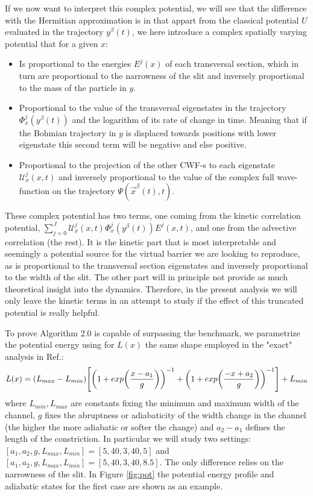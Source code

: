 \documentclass[11pt, a4paper]{article} %
\newcommand{\U}{\mathscr{U}}
\begin{document}
If we now want to interpret this complex potential, we will see that the difference with the Hermitian approximation is in that appart from the classical potential $U$ evaluated in the trajectory $y^\beta(t)$, we here introduce a complex spatially varying potential that for a given $x$:
\begin{itemize}
\item Is proportional to the energies $E^j(x)$ of each transversal section, which in turn are proportional to the narrowness of the slit and inversely proportional to the mass of the particle in $y$.
\item Proportional to the value of the transversal eigenstates in the trajectory $\Phi^j_x(y^\beta(t))$ and the logarithm of its rate of change in time. Meaning that if the Bohmian trajectory in $y$ is displaced towards positions with lower eigenstate this second term will be negative and else positive.
\item Proportional to the projection of the other CWF-s to each eigenstate $\U^j_x(x,t)$ and inversely proportional to the value of the complex full wave-function on the trajectory $\Psi(\vec{x}^\beta(t),t)$.
\end{itemize}

These complex potential has two terms, one coming from the kinetic correlation potential, $\sum_{j=0}^J \U^j_x(x,t)\Phi^j_x(y^\beta(t)) E^j(x,t)$,  and one from the advective correlation (the rest). It is the kinetic part that is most interpretable and seemingly a potential source for the virtual barrier we are looking to reproduce, as is proportional to the transversal section eigenstates and inversely proportional to the width of the slit. The other part will in principle not provide as much theoretical insight into the dynamics. Therefore, in the present analysis we will only leave the kinetic terms in an attempt to study if the effect of this truncated potential is really helpful.


To prove Algorithm 2.0 is capable of surpassing the benchmark, we parametrize the potential energy using for $L(x)$ the same shape employed in the "exact" analysis in Ref.\cite{Dev}:
$$
L(x)=(L_{max}-L_{min})\qty[\qty(1+exp\qty(\frac{x-a_1}{g}))^{-1}+\qty(1+exp\qty(\frac{-x+a_2}{g}))^{-1}]+L_{min}
$$
where $L_{min}, L_{max}$ are constants fixing the minimum and maximum width of the channel, $g$ fixes the abruptness or adiabaticity of the width change in the channel (the higher the more adiabatic or softer the change) and $a_2-a_1$ defines the length of the constriction. In particular we will study two settings: $[a_1,a_2,g,L_{max},L_{min}]=[5,40,3,40,5]$ and $[a_1,a_2,g,L_{max},L_{min}]=[5,40,3,40,8.5]$. The only difference relies on the narrowness of the slit. In Figure \ref{fig:pot} the potential energy profile and adiabatic states for the first case are shown as an example.
\end{document}
